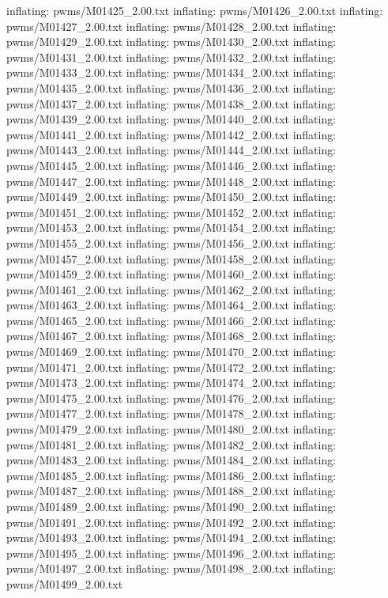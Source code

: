 \documentclass[letterpaper,10pt,english]{sphinxmanual}
\begin{document}
{\begin{sphinxVerbatim}[commandchars=\\\{\}]
  inflating: pwms/M01425\_2.00.txt
  inflating: pwms/M01426\_2.00.txt
  inflating: pwms/M01427\_2.00.txt
  inflating: pwms/M01428\_2.00.txt
  inflating: pwms/M01429\_2.00.txt
  inflating: pwms/M01430\_2.00.txt
  inflating: pwms/M01431\_2.00.txt
  inflating: pwms/M01432\_2.00.txt
  inflating: pwms/M01433\_2.00.txt
  inflating: pwms/M01434\_2.00.txt
  inflating: pwms/M01435\_2.00.txt
  inflating: pwms/M01436\_2.00.txt
  inflating: pwms/M01437\_2.00.txt
  inflating: pwms/M01438\_2.00.txt
  inflating: pwms/M01439\_2.00.txt
  inflating: pwms/M01440\_2.00.txt
  inflating: pwms/M01441\_2.00.txt
  inflating: pwms/M01442\_2.00.txt
  inflating: pwms/M01443\_2.00.txt
  inflating: pwms/M01444\_2.00.txt
  inflating: pwms/M01445\_2.00.txt
  inflating: pwms/M01446\_2.00.txt
  inflating: pwms/M01447\_2.00.txt
  inflating: pwms/M01448\_2.00.txt
  inflating: pwms/M01449\_2.00.txt
  inflating: pwms/M01450\_2.00.txt
  inflating: pwms/M01451\_2.00.txt
  inflating: pwms/M01452\_2.00.txt
  inflating: pwms/M01453\_2.00.txt
  inflating: pwms/M01454\_2.00.txt
  inflating: pwms/M01455\_2.00.txt
  inflating: pwms/M01456\_2.00.txt
  inflating: pwms/M01457\_2.00.txt
  inflating: pwms/M01458\_2.00.txt
  inflating: pwms/M01459\_2.00.txt
  inflating: pwms/M01460\_2.00.txt
  inflating: pwms/M01461\_2.00.txt
  inflating: pwms/M01462\_2.00.txt
  inflating: pwms/M01463\_2.00.txt
  inflating: pwms/M01464\_2.00.txt
  inflating: pwms/M01465\_2.00.txt
  inflating: pwms/M01466\_2.00.txt
  inflating: pwms/M01467\_2.00.txt
  inflating: pwms/M01468\_2.00.txt
  inflating: pwms/M01469\_2.00.txt
  inflating: pwms/M01470\_2.00.txt
  inflating: pwms/M01471\_2.00.txt
  inflating: pwms/M01472\_2.00.txt
  inflating: pwms/M01473\_2.00.txt
  inflating: pwms/M01474\_2.00.txt
  inflating: pwms/M01475\_2.00.txt
  inflating: pwms/M01476\_2.00.txt
  inflating: pwms/M01477\_2.00.txt
  inflating: pwms/M01478\_2.00.txt
  inflating: pwms/M01479\_2.00.txt
  inflating: pwms/M01480\_2.00.txt
  inflating: pwms/M01481\_2.00.txt
  inflating: pwms/M01482\_2.00.txt
  inflating: pwms/M01483\_2.00.txt
  inflating: pwms/M01484\_2.00.txt
  inflating: pwms/M01485\_2.00.txt
  inflating: pwms/M01486\_2.00.txt
  inflating: pwms/M01487\_2.00.txt
  inflating: pwms/M01488\_2.00.txt
  inflating: pwms/M01489\_2.00.txt
  inflating: pwms/M01490\_2.00.txt
  inflating: pwms/M01491\_2.00.txt
  inflating: pwms/M01492\_2.00.txt
  inflating: pwms/M01493\_2.00.txt
  inflating: pwms/M01494\_2.00.txt
  inflating: pwms/M01495\_2.00.txt
  inflating: pwms/M01496\_2.00.txt
  inflating: pwms/M01497\_2.00.txt
  inflating: pwms/M01498\_2.00.txt
  inflating: pwms/M01499\_2.00.txt

\end{sphinxVerbatim}}
\end{document}
